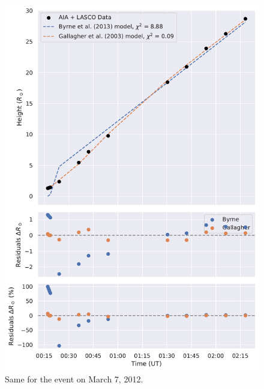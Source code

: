 \begin{figure}[!htp]
	\centering
	\includegraphics[width=0.8\hsize]{chapter2/figs/appendix/height_profile_residuals_aia_lasco_120307_01.pdf}
	\caption{Same for the event on March 7, 2012.}
\end{figure}

